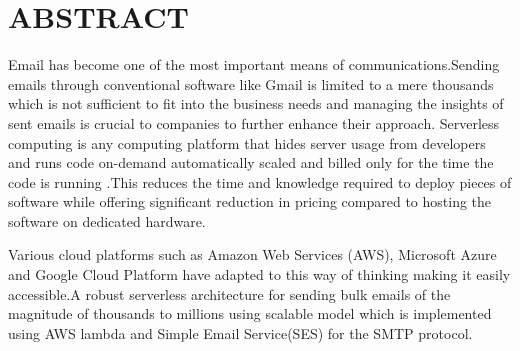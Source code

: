 \chapter*{ABSTRACT}
\thispagestyle{empty}
\justifying

Email has become one of the most important means of communications.Sending emails through conventional software like Gmail is limited to a mere thousands which is not sufficient to fit into the business needs and managing the insights of sent emails is crucial to companies to further enhance their approach. Serverless computing is any computing platform that hides server usage from developers and runs code on-demand automatically scaled and billed only for the time the code is running \cite{castro2019rise}.This reduces the time and knowledge required to deploy pieces of software while offering significant reduction in pricing compared to hosting the software on dedicated hardware.\par

\vspace{0.2cm}
\noindent
Various cloud platforms such as Amazon Web Services (AWS), Microsoft Azure and Google Cloud Platform have adapted to this way of thinking making it easily accessible.A robust serverless architecture for sending bulk emails of the magnitude of thousands to millions using scalable model which is implemented using AWS lambda\cite{awslambda} and Simple Email Service(SES) for the SMTP protocol.\par 

